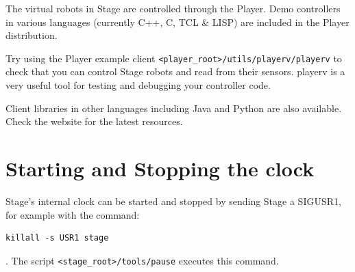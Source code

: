 \documentclass[11pt,twoside]{report}
\begin{document}
The virtual robots in Stage are controlled through the Player.  Demo
controllers in various languages (currently C++, C, TCL \& LISP) are
included in the Player distribution.

Try using the Player example client
\verb+<player_root>/utils/playerv/playerv+ to check that you can control
Stage robots and read from their sensors. playerv is a very useful
tool for testing and debugging your controller code.

Client libraries in other languages including Java and Python are also
available. Check the website for the latest resources.

\section{Starting and Stopping the clock}

Stage's internal clock can be started and stopped by sending Stage a
SIGUSR1, for example with the command:
\begin{verbatim}
killall -s USR1 stage
\end{verbatim}.
The script \verb'<stage_root>/tools/pause' executes this command.



\end{document}
